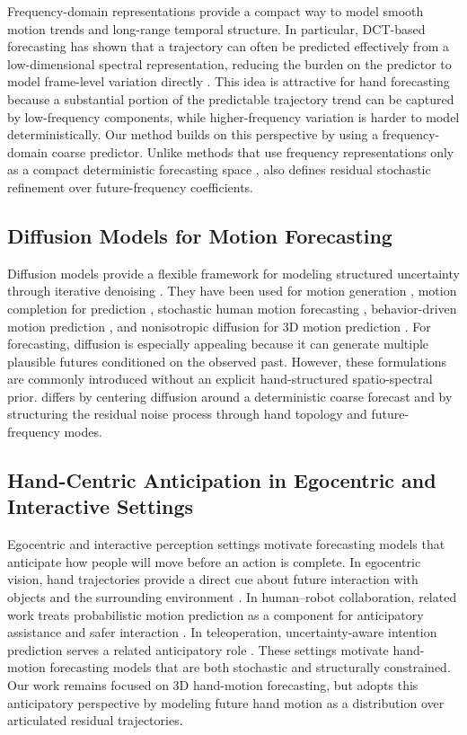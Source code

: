 Frequency-domain representations provide a compact way to model smooth motion trends and long-range temporal structure. In particular, DCT-based forecasting has shown that a trajectory can often be predicted effectively from a low-dimensional spectral representation, reducing the burden on the predictor to model frame-level variation directly \cite{Guo2023SiMLPe}. This idea is attractive for hand forecasting because a substantial portion of the predictable trajectory trend can be captured by low-frequency components, while higher-frequency variation is harder to model deterministically. Our method builds on this perspective by using a frequency-domain coarse predictor. Unlike methods that use frequency representations only as a compact deterministic forecasting space \cite{Guo2023SiMLPe}, \modelname{} also defines residual stochastic refinement over future-frequency coefficients.

\subsection{Diffusion Models for Motion Forecasting}

Diffusion models provide a flexible framework for modeling structured uncertainty through iterative denoising \cite{Ho2020DDPM,Song2021DDIM,Salimans2022ProgressiveDistillation}. They have been used for motion generation \cite{Tevet2023MDM}, motion completion for prediction \cite{Chen2023HumanMAC}, stochastic human motion forecasting \cite{Sun2024CoMusion}, behavior-driven motion prediction \cite{barquero2023belfusion}, and nonisotropic diffusion for 3D motion prediction \cite{Curreli2025SkeletonDiffusion}. For forecasting, diffusion is especially appealing because it can generate multiple plausible futures conditioned on the observed past. However, these formulations are commonly introduced without an explicit hand-structured spatio-spectral prior. \modelname{} differs by centering diffusion around a deterministic coarse forecast and by structuring the residual noise process through hand topology and future-frequency modes.

\subsection{Hand-Centric Anticipation in Egocentric and Interactive Settings}

Egocentric and interactive perception settings motivate forecasting models that anticipate how people will move before an action is complete. In egocentric vision, hand trajectories provide a direct cue about future interaction with objects and the surrounding environment \cite{Bao2023USST,Chen2025EgoMAN}. In human--robot collaboration, related work treats probabilistic motion prediction as a component for anticipatory assistance and safer interaction \cite{Kothari2023ConstrainedHRCMotionPrediction}. In teleoperation, uncertainty-aware intention prediction serves a related anticipatory role \cite{Heman2026TeleoperationIntent}. These settings motivate hand-motion forecasting models that are both stochastic and structurally constrained. Our work remains focused on 3D hand-motion forecasting, but adopts this anticipatory perspective by modeling future hand motion as a distribution over articulated residual trajectories.
